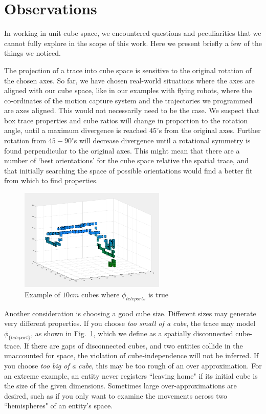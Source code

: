 \section{Observations}
\label{sec:observations}

In working in unit cube space, we encountered questions and peculiarities that we cannot fully explore in the scope of this work.  
Here we present briefly a few of the things we noticed.

The projection of a trace into cube space is sensitive to the original rotation of the chosen axes.
So far, we have chosen real-world situations where the axes are aligned with our cube space, like in our examples with flying robots, where the co-ordinates of the motion capture system and the trajectories we programmed are axes aligned.
This would not necessarily need to be the case.
We suspect that box trace properties and cube ratios will change in proportion to the rotation angle, until a maximum divergence is reached $45^{\circ}$s from the original axes.
Further rotation from $45-90^{\circ}$s will decrease divergence until a rotational symmetry is found perpendicular to the original axes.
This might mean that there are a number of `best orientations' for the cube space relative the spatial trace, and that initially searching the space of possible orientations would find a better fit from which to find properties.

\begin{figure}
  \centering
  \includegraphics[width=0.62\textwidth]{./figures/cubesTooSmall.png}
  \caption{Example of $10cm$ cubes where $\phi_{teleports}$ is true}
  \label{fig:teleport}
\end{figure}

Another consideration is choosing a good cube size.  
Different sizes may generate very different properties.
If you choose \emph{too small of a cube}, the trace may model $\phi_{\{teleport\}}$, as shown in Fig.~\ref{fig:teleport}, which we define as a spatially disconnected cube-trace.
If there are gaps of disconnected cubes, and two entities collide in the unaccounted for space, the violation of cube-independence will not be inferred.
 If you choose \emph{too big of a cube}, this may be too rough of an over approximation.
For an extreme example, an entity never registers ``leaving home" if its initial cube is the size of the given dimensions.
Sometimes large over-approximations are desired, such as if you only want to examine the movements across two ``hemispheres" of an entity's space.

